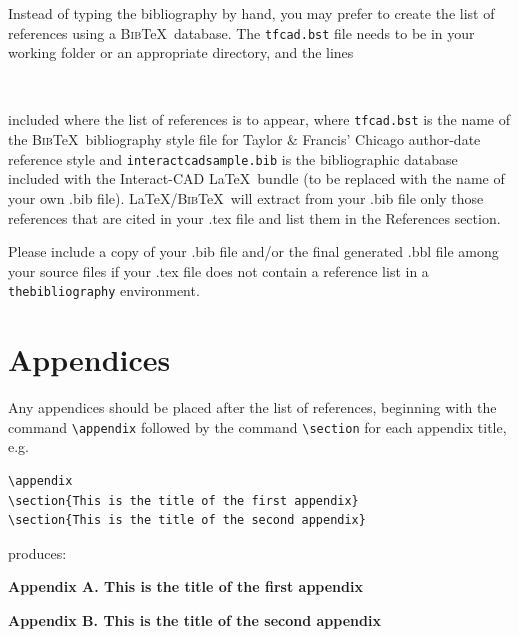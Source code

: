 \documentclass[]{interact}
\theoremstyle{plain}%
\theoremstyle{definition}
\theoremstyle{remark}
\begin{document}
Instead of typing the bibliography by hand, you may prefer to create the list of references using a \textsc{Bib}\TeX\ database. The \texttt{tfcad.bst} file needs to be in your working folder or an appropriate directory, and the lines
\begin{verbatim}


\end{verbatim}
included where the list of references is to appear, where \texttt{tfcad.bst} is the name of the \textsc{Bib}\TeX\ bibliography style file for Taylor \& Francis' Chicago author-date reference style and \texttt{interactcadsample.bib} is the bibliographic database included with the \textsf{Interact}-CAD \LaTeX\ bundle (to be replaced with the name of your own .bib file). \LaTeX/\textsc{Bib}\TeX\ will extract from your .bib file only those references that are cited in your .tex file and list them in the References section.

Please include a copy of your .bib file and/or the final generated .bbl file among your source files if your .tex file does not contain a reference list in a \texttt{thebibliography} environment.


\section{Appendices}

Any appendices should be placed after the list of references, beginning with the command \verb"\appendix" followed by the command \verb"\section" for each appendix title, e.g.
\begin{verbatim}
\appendix
\section{This is the title of the first appendix}
\section{This is the title of the second appendix}
\end{verbatim}
produces:\medskip

\noindent\textbf{Appendix A. This is the title of the first appendix}\medskip

\noindent\textbf{Appendix B. This is the title of the second appendix}\medskip
\end{document}

